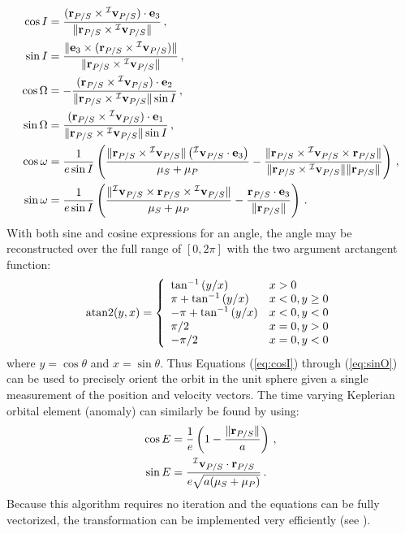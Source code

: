\begin{align}
\cos I &= \frac{(\mathbf r_{P/S} \times  {}^\mathcal I \mathbf v_{P/S}) \cdot \mathbf e_3}{\Vert \mathbf r_{P/S} \times  {}^\mathcal I \mathbf v_{P/S}\Vert} \label{eq:cosI}\,,
\\
\sin I  &= \frac{\Vert  \mathbf e_3 \times (\mathbf r_{P/S} \times  {}^\mathcal I \mathbf v_{P/S}) \Vert}{\Vert \mathbf r_{P/S} \times  {}^\mathcal I \mathbf v_{P/S}\Vert} \,,
\\
\cos \Omega &= -\frac{(\mathbf r_{P/S} \times  {}^\mathcal I \mathbf v_{P/S}) \cdot \mathbf e_2}{\Vert \mathbf r_{P/S} \times  {}^\mathcal I \mathbf v_{P/S}\Vert \sin I} \,,
\\
\sin \Omega  &= \frac{(\mathbf r_{P/S} \times  {}^\mathcal I \mathbf v_{P/S}) \cdot  \mathbf e_1}{\Vert \mathbf r_{P/S} \times  {}^\mathcal I \mathbf v_{P/S}\Vert \sin I} \,,
\\
\cos \omega &= \frac{1}{e\sin I} \left(\frac{\Vert \mathbf r_{P/S} \times  {}^\mathcal I \mathbf v_{P/S} \Vert \left( {}^\mathcal I \mathbf v_{P/S} \cdot \mathbf e_3\right)}{\mu_S + \mu_P} - \frac{ \Vert \mathbf r_{P/S} \times  {}^\mathcal I \mathbf v_{P/S} \times \mathbf r_{P/S}  \Vert}{\Vert \mathbf r_{P/S} \times  {}^\mathcal I \mathbf v_{P/S} \Vert \Vert \mathbf r_{P/S} \Vert}\right) \,,
\\
\sin \omega  &= \frac{1}{e\sin I} \left(\frac{ \Vert  {}^\mathcal I \mathbf v_{P/S} \times \mathbf r_{P/S} \times  {}^\mathcal I \mathbf v_{P/S} \Vert}{\mu_S + \mu_P} - \frac{ \mathbf r_{P/S} \cdot \mathbf e_3}{\Vert \mathbf r_{P/S} \Vert}  \right) \label{eq:sinO}\, .
\end{align}
With both sine and cosine expressions for an angle, the angle may be reconstructed over the full range of $[0, 2\pi]$ with the two argument arctangent function:
\begin{equation}
\textrm{atan2}(y,x) = \left\{\begin{array}{l l}
\tan^{-1}\left(y/x\right) & x > 0\\
\pi + \tan^{-1}\left(y/x\right) & x < 0, y \ge 0\\
-\pi + \tan^{-1}\left(y/x\right) & x < 0, y < 0\\
\pi/2 & x =  0, y > 0\\
-\pi/2 & x = 0, y < 0
\end{array} \right.
\end{equation}
where $y = \cos\theta$ and $x = \sin\theta$.  Thus Equations (\ref{eq:cosI}) through (\ref{eq:sinO}) can be used to precisely orient the orbit in the unit sphere given a single measurement of the position and velocity vectors.  The time varying Keplerian orbital element (anomaly) can similarly be found by using:
\begin{align}
\cos E &= \frac{1}{e}\left(1 - \frac{\Vert \mathbf r_{P/S} \Vert}{a}\right) \,,\\
\sin E &= \frac{{}^\mathcal I \mathbf v_{P/S} \cdot \mathbf r_{P/S}}{e\sqrt{a(\mu_S + \mu_P)}} \label{eq:vec2orbelemf}\,.
\end{align}
Because this algorithm requires no iteration and the equations can be fully vectorized, the transformation can be implemented very efficiently (see ).

